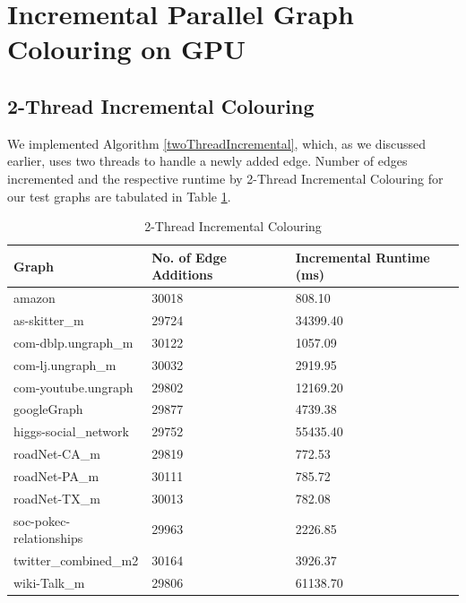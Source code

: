 \documentclass[MTech]{iitmdiss}
\begin{document}
\section{Incremental Parallel Graph Colouring on GPU}
\subsection{2-Thread Incremental Colouring}
We implemented Algorithm \ref{twoThreadIncremental}, which, as we discussed earlier, uses two threads to handle a newly added edge. Number of edges incremented and the respective runtime by 2-Thread Incremental Colouring for our test graphs are tabulated in Table \ref{twoInc}.

\clearpage

\begin{table}[]
\centering
\begin{tabular}{|l|l|l|}
\hline
Graph                   & No. of Edge Additions & Incremental Runtime (ms) \\ \hline
amazon                  & 30018                 & 808.10                   \\ \hline
as-skitter\_m           & 29724                 & 34399.40                 \\ \hline
com-dblp.ungraph\_m     & 30122                 & 1057.09                  \\ \hline
com-lj.ungraph\_m       & 30032                 & 2919.95                  \\ \hline
com-youtube.ungraph     & 29802                 & 12169.20                 \\ \hline
googleGraph             & 29877                 & 4739.38                  \\ \hline
higgs-social\_network   & 29752                 & 55435.40                 \\ \hline
roadNet-CA\_m           & 29819                 & 772.53                   \\ \hline
roadNet-PA\_m           & 30111                 & 785.72                   \\ \hline
roadNet-TX\_m           & 30013                 & 782.08                   \\ \hline
soc-pokec-relationships & 29963                 & 2226.85                  \\ \hline
twitter\_combined\_m2   & 30164                 & 3926.37                  \\ \hline
wiki-Talk\_m            & 29806                 & 61138.70                 \\ \hline
\end{tabular}
\caption{2-Thread Incremental Colouring}
\label{twoInc}
\end{table}
\end{document}
